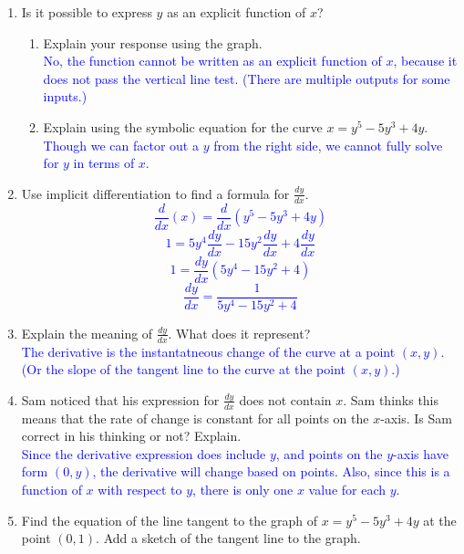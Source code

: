\documentclass{ximera}
\begin{document}
\begin{exercise}
\begin{image}
    \end{image}
  \begin{enumerate}
    \item Is it possible to express $y$ as an explicit function of $x$?  
    \begin{enumerate}
        \item Explain your response using the graph.\\
        \textcolor{blue}{No, the function cannot be written as an explicit function of $x$, because it does not pass the vertical line test. (There are multiple outputs for some inputs.)}
        \item Explain using the symbolic equation for the curve $x=y^5-5y^3+4y$.\\
        \textcolor{blue}{Though we can factor out a $y$ from the right side, we cannot fully solve for $y$ in terms of $x$.  }
    \end{enumerate}
    \item Use implicit differentiation to find a formula for $\frac{dy}{dx}$.  \\
    \textcolor{blue}{
      \[\frac{d}{dx}(x)=\frac{d}{dx}(y^5-5y^3+4y)\]
      \[1=5y^4\frac{dy}{dx}-15y^2\frac{dy}{dx}+4\frac{dy}{dx}\]
      \[1=\frac{dy}{dx}(5y^4-15y^2+4)\]
      \[\frac{dy}{dx}=\frac{1}{5y^4-15y^2+4}\]
    }
    \item Explain the meaning of $\frac{dy}{dx}$.  What does it represent?\\
    \textcolor{blue}{The derivative is the instantatneous change of the curve at a point $(x,y)$. (Or the slope of the tangent line to the curve at the point $(x,y)$.)}
    \item Sam noticed that his expression for $\frac{dy}{dx}$ does not contain $x$.  Sam thinks this means that the rate of change is constant for all points on the $x$-axis.  Is Sam correct in his thinking or not? Explain.\\
    \textcolor{blue}{Since the derivative expression does include $y$, and points on the $y$-axis have form $(0,y)$, the derivative will change based on points. Also, since this is a function of $x$ with respect to $y$, there is only one $x$ value for each $y$.}
    \item Find the equation of the line tangent to the graph of $x=y^5-5y^3+4y$ at the point $(0,1)$.  Add a sketch of the tangent line to the graph.\\

\end{enumerate}
\end{exercise}
\end{document}
